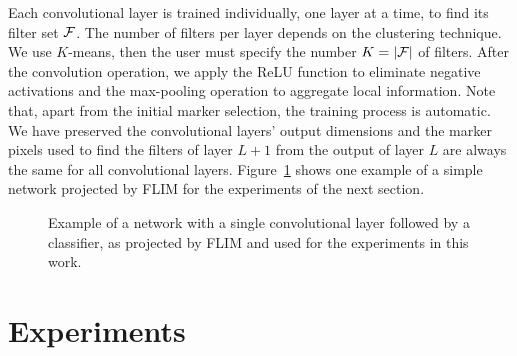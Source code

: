 \documentclass[a4paper,conference]{IEEEtran}
\begin{document}
Each convolutional layer is trained individually, one layer at a time, to find its filter set ${\cal F}$. The number of filters per layer depends on the clustering technique. We use $K$-means, then the user must specify the number $K=|{\cal F}|$ of filters. After the convolution operation, we apply the ReLU function to eliminate negative activations and the max-pooling operation to aggregate local information. Note that, apart from the initial marker selection, the training process is automatic. We have preserved the convolutional layers' output dimensions and the marker pixels used to find the filters of layer $L+1$ from the output of layer $L$ are always the same for all convolutional layers. Figure~\ref{fig:tree} shows one example of a simple network projected by FLIM for the experiments of the next section. 

\begin{figure}
  \begin{center}

  \end{center}
  \caption{Example of a network with a single convolutional layer followed by a classifier, as projected by FLIM and used for the experiments in this work.}
  \label{fig:tree}
\end{figure}

\section{Experiments}
\end{document}
